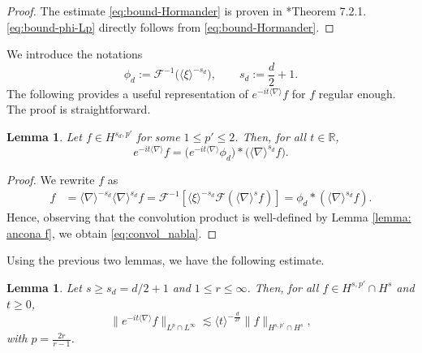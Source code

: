 \documentclass[12pt]{article}
\theoremstyle{plain}
\newtheorem{lemma}[theo]{Lemma}
\begin{document}
	\begin{proof}
	    The estimate \eqref{eq:bound-Hormander} is proven in \cite{Hormander_book_hyperbolic}*{Theorem 7.2.1}. 
	    \eqref{eq:bound-phi-Lp} directly follows from \eqref{eq:bound-Hormander}.
	\end{proof}



	
	We introduce the notations
	\begin{equation*}
	    \phi_d:=\mathcal{F}^{-1}\big(\langle\xi\rangle^{-s_d}\big),\qquad s_d:=\frac{d}{2}+1.
	\end{equation*}
	The following provides a useful representation of $e^{-it\langle\nabla\rangle}f$ for $f$ regular enough. The proof is straightforward.
	
	\begin{lemma}\label{lm:repr_with_phid}
	    Let $f\in H^{s_d,p'}$ for some $1\le p'\le 2$. Then, for all $t\in\mathbb{R}$,
	    \begin{equation}\label{eq:convol_nabla}
	        e^{-it\langle\nabla\rangle}f=\big(e^{-it\langle\nabla\rangle}\phi_d\big)*\big(\langle\nabla\rangle^{s_d}f\big).
	    \end{equation}
	\end{lemma}
	
	\begin{proof}
	    We rewrite $f$ as
		\begin{align*}
			f  &= \langle \nabla \rangle^{-s_d}\langle \nabla \rangle^{s_d} f= \mathcal{F}^{-1}[\langle \xi \rangle^{-s_d}\mathcal{F}(\langle \nabla\rangle^{s} f )] 
			= \phi_d * (\langle \nabla\rangle^{s_d} f ).
		\end{align*}
		Hence,
		observing that the convolution product is well-defined by Lemma \ref{lemma: ancona f}, we obtain \eqref{eq:convol_nabla}.
	\end{proof}
	
	Using the previous two lemmas, we have the following estimate.
	

	
	\begin{lemma}
	\label{lemma: free t dec interp}
		Let $s\ge s_d=d/2+1$ and $1\le r \le\infty$. Then, for all $f \in H^{s,p'}\cap H^{s}$ and $t\ge0$, 
		\begin{equation*}
			\|e^{-it\langle \nabla \rangle} f\|_{L^{p}\cap L^\infty} \lesssim \langle t\rangle^{-\frac{d}{2r}}\| f\|_{H^{s,p'}\cap H^{s}},
		\end{equation*}
		with $p=\frac{2r}{r-1}$.
		\end{lemma}
\end{document}
